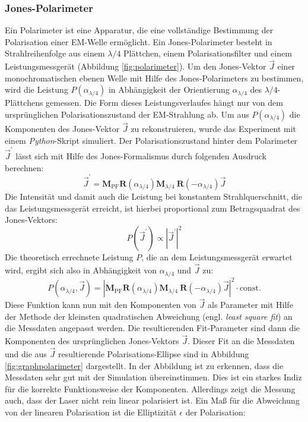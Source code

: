 \documentclass[a4paper, titlepage,  ngerman]{book}
\begin{document}
	\subsubsection{Jones-Polarimeter}
	Ein Polarimeter ist eine Apparatur, die eine vollständige Bestimmung der Polarisation einer EM-Welle ermöglicht. Ein Jones-Polarimeter besteht in Strahlreihenfolge aus einem $\lambda / 4$ Plättchen, einem Polarisationsfilter und einem Leistungsmessgerät (Abbildung \ref{fig:polarimeter}). Um den Jones-Vektor $\vec{J}$ einer monochromatischen ebenen Welle mit Hilfe des Jones-Polarimeters zu bestimmen, wird die Leistung $P(\alpha_{\lambda/4})$ in Abhängigkeit der Orientierung $\alpha_{\lambda/4}$ des $\lambda / 4$-Plättchens gemessen. Die Form dieses Leistungsverlaufes hängt nur von dem ursprünglichen Polarisationszustand der EM-Strahlung ab. Um aus $P(\alpha_{\lambda/4})$ die Komponenten des Jones-Vektor $\vec{J}$ zu rekonstruieren, wurde das Experiment mit einem \textit{Python}-Skript simuliert. Der Polarisationszustand hinter dem Polarimeter $\vec{J}^\prime$ lässt sich mit Hilfe des Jones-Formalismus durch folgenden Ausdruck berechnen:
	\begin{equation}
		\vec{J}^\prime = \boldsymbol{M}_\mathrm{PF} \boldsymbol{R}(\alpha_{\lambda/4})\boldsymbol{M}_{\lambda / 4}\ \boldsymbol{R}(-\alpha_{\lambda/4})\vec{J}
	\end{equation}
	Die Intensität und damit auch die Leistung bei konstantem Strahlquerschnitt, die das Leistungsmessgerät erreicht, ist hierbei proportional zum Betragsquadrat des Jones-Vektors:
	\begin{equation}
		P(\vec{J}^\prime) \propto \left|\vec{J}^\prime\right|^2
	\end{equation}
	Die theoretisch errechnete Leistung $P$, die an dem Leistungsmessgerät erwartet wird, ergibt sich also in Abhängigkeit von $\alpha_{\lambda/4}$ und $\vec{J}$ zu:
	\begin{equation}
		P(\alpha_{\lambda/4}, \vec{J}) = \left|\boldsymbol{M}_\mathrm{PF} \boldsymbol{R}(\alpha_{\lambda/4})\boldsymbol{M}_{\lambda / 4}\ \boldsymbol{R}(-\alpha_{\lambda/4})\vec{J}\right|^2 \cdot \mathrm{const.}
		\label{eq:simulation_polarimeter}
	\end{equation}
	Diese Funktion kann nun mit den Komponenten von $\vec{J}$ als Parameter mit Hilfe der Methode der kleinsten quadratischen Abweichung (engl. \textit{least square fit}) an die Messdaten angepasst werden. Die resultierenden Fit-Parameter sind dann die Komponenten des ursprünglichen Jones-Vektors $\vec{J}$. Dieser Fit an die Messdaten und die aus $\vec{J}$ resultierende Polarisations-Ellipse sind in Abbildung \ref{fig:graphpolarimeter} dargestellt. In der Abbildung ist zu erkennen, dass die Messdaten sehr gut mit der Simulation übereinstimmen. Dies ist ein starkes Indiz für die korrekte Funktionsweise der Komponenten. Allerdings zeigt die Messung auch, dass der Laser nicht rein linear polarisiert ist. Ein Maß für die Abweichung von der linearen Polarisation ist die Elliptizität $\epsilon$ der Polarisation:
\end{document}

